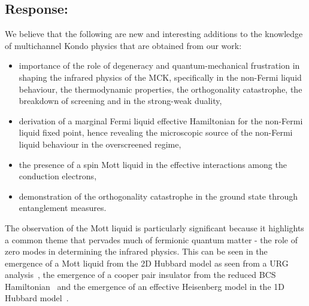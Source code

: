 \documentclass[11pt]{article}
\newcommand{\response}[1]{{\color{blue}\subsection*{Response:}{#1}}}
\begin{document}
\response{
We believe that the following are new and interesting additions to the knowledge of multichannel Kondo physics that are obtained from our work:
\begin{itemize}
	\item importance of the role of degeneracy and quantum-mechanical frustration in shaping the infrared physics of the MCK, specifically in the non-Fermi liquid behaviour, the thermodynamic properties, the orthogonality catastrophe, the breakdown of screening and in the strong-weak duality,
	\item derivation of a marginal Fermi liquid effective Hamiltonian for the non-Fermi liquid fixed point, hence revealing the microscopic source of the non-Fermi liquid behaviour in the overscreened regime,
	\item the presence of a spin Mott liquid in the effective interactions among the conduction electrons,
	\item demonstration of the orthogonality catastrophe in the ground state through entanglement measures.
\end{itemize}
The observation of the Mott liquid is particularly significant because it highlights a common theme that pervades much of fermionic quantum matter - the role of zero modes in determining the infrared physics. This can be seen in the emergence of a Mott liquid from the 2D Hubbard model as seen from a URG analysis~\cite{anirbanmott1,anirbanmott2,mukherjeeMERG2022}, the emergence of a cooper pair insulator from the reduced BCS Hamiltonian~\cite{siddharthacpi} and the emergence of an effective Heisenberg model in the 1D Hubbard model~\cite{1dhubjhep}.
}



\end{document}
